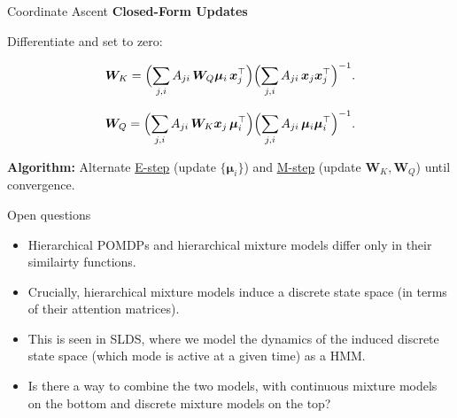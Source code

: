 \documentclass{beamer}
\begin{document}
\begin{frame}{Coordinate Ascent}
    \large
    \textbf{Closed-Form Updates}
    
    Differentiate and set to zero:
    
    \[
    \bm{W}_K
    =
    \Bigl(\sum_{j,i}A_{ji}\,\bm{W}_Q\bm{\mu}_i\,\bm{x}_j^\top\Bigr)
    \Bigl(\sum_{j,i}A_{ji}\,\bm{x}_j\bm{x}_j^\top\Bigr)^{-1}.
    \]
    
    \[
    \bm{W}_Q
    =
    \Bigl(\sum_{j,i}A_{ji}\,\bm{W}_K\bm{x}_j\,\bm{\mu}_i^\top\Bigr)
    \Bigl(\sum_{j,i}A_{ji}\,\bm{\mu}_i\bm{\mu}_i^\top\Bigr)^{-1}.
    \]
    
    \bigskip
    
    \textbf{Algorithm:}  
    Alternate \underline{E-step} (update \(\{\bm{\mu}_i\}\)) and \underline{M-step} (update \(\bm{W}_K,\bm{W}_Q\)) until convergence.
    \end{frame}
    

\begin{frame}{Open questions}
    \begin{itemize}
        \item Hierarchical POMDPs and hierarchical mixture models differ only in their similairty functions.
        \item Crucially, hierarchical mixture models induce a discrete state space (in terms of their attention matrices). 
        \item This is seen in SLDS, where we model the dynamics of the induced discrete state space (which mode is active at a given time) as a HMM. 
        \item Is there a way to combine the two models, with continuous mixture models on the bottom and discrete mixture models on the top?
    \end{itemize}
\end{frame}



%     
%     
\end{document}
